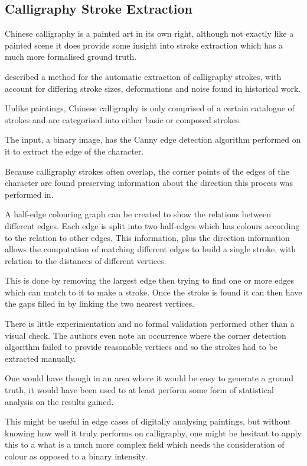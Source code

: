 \documentclass[conference]{IEEEtran}
\begin{document}
\subsection{Calligraphy Stroke Extraction}

Chinese calligraphy is a painted art in its own right, although not exactly
like a painted scene it does provide some insight into stroke extraction which
has a much more formalised ground truth.

\cite{xu2005automatic} described a method for the automatic extraction of
calligraphy strokes, with account for differing stroke sizes, deformations and
noise found in historical work.

Unlike paintings, Chinese calligraphy is only comprised of a certain catalogue
of strokes and are categorised into either basic or composed strokes.

The input, a binary image, has the Canny edge detection
algorithm\cite{canny86computational} performed on it to extract the edge of the
character.

Because calligraphy strokes often overlap, the corner points of the edges of
the character are found preserving information about the direction this process
was performed in.

A half-edge colouring graph can be created to show the relations between
different edges. Each edge is split into two half-edges which has colours
according to the relation to other edges. This information, plus the direction
information allows the computation of matching different edges to build a
single stroke, with relation to the distances of different vertices.

This is done by removing the largest edge then trying to find one or more edges
which can match to it to make a stroke. Once the stroke is found it can then
have the gaps filled in by linking the two nearest vertices.

There is little experimentation and no formal validation performed other than a
visual check. The authors even note an occurrence where the corner detection
algorithm failed to provide reasonable vertices and so the strokes had to be
extracted manually.

One would have though in an area where it would be easy to generate a ground
truth, it would have been used to at least perform some form of statistical
analysis on the results gained.

This might be useful in edge cases of digitally analysing paintings, but
without knowing how well it truly performs on calligraphy, one might be
hesitant to apply this to a what is a much more complex field which needs the
consideration of colour as opposed to a binary intensity.
\end{document}
